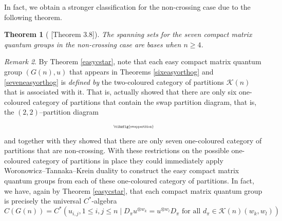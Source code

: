 \documentclass{article}
\theoremstyle{plain}
\newtheorem{theorem}{Theorem}[section]
\theoremstyle{definition}
\theoremstyle{remark}
\newtheorem{remark}[theorem]{Remark}
\begin{document}
In fact, we obtain a stronger classification for the non-crossing case 
due to the following theorem.

\begin{theorem}[\citet{banica} {[Theorem 3.8]}]
	The spanning sets for the seven compact matrix quantum groups 
	in the non-crossing case are bases when $n \geq 4$. 
\end{theorem}

\begin{remark} \label{partweightconstruction}
By Theorem \ref{easycstar},
note that each easy compact matrix quantum group 
$(G(n), u)$ that appears in 
Theorems \ref{sixeasyorthog} and \ref{seveneasyorthog}
is \textit{defined by}
the two-coloured category of partitions
$\mathcal{K}(n)$ that is 
associated with it.
	That is, \citet{banica} actually
	showed that there are only six one-coloured category of partitions
	that contain the swap partition diagram, that is, the $(2,2)$--partition diagram
	\begin{equation}
		\begin{aligned}
			\scalebox{0.5}{\tikzfig{swappartition}}
		\end{aligned}
	\end{equation}
	and together with \citet{weber2013} they showed that there are only
	seven one-coloured category of partitions that are non-crossing.
	With these restrictions on the possible one-coloured category of partitions
	in place
	they could immediately apply Woronowicz--Tannaka--Krein duality to construct the 
	easy compact matrix quantum groups from each of these 
	one-coloured category of partitions.
	In fact, we have, again by Theorem \ref{easycstar}, that
	each compact matrix quantum group is precisely the universal $C^*$-algebra
\begin{equation}
	C(G(n)) = C^{*}(u_{i,j}, 1 \leq i,j \leq n \mid
	D_\pi{u^{\otimes w_k}} = {u^{\otimes w_l}}D_\pi 
	\text{ for all } d_\pi \in \mathcal{K}(n)(w_k,w_l))
\end{equation}
\end{remark}

\end{document}
